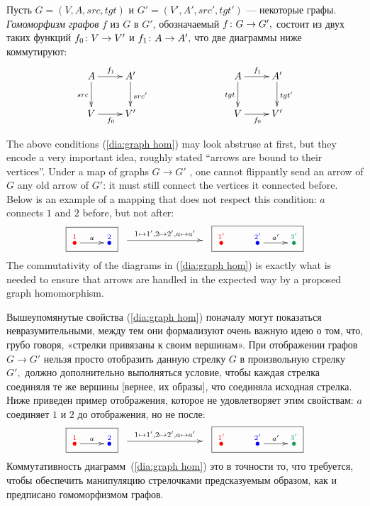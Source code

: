 \documentclass[../main/CT4S-EN-RU]{subfiles}
\begin{document}
\begin{definitionRUS}\label{def:graph homomorphism}
Пусть $G=(V,A,src,tgt)$ и $G'=(V',A',src',tgt')$ — некоторые графы. {\em Гомоморфизм графов} $f$ из $G$ в $G'$, обозначаемый $f\colon G\rightarrow G',$ состоит из двух таких функций $f_0\colon V\rightarrow V'$ и $f_1\colon A\rightarrow A',$ что две диаграммы ниже коммутируют:
\begin{align}\label{dia:graph hom}
\xymatrix{
    A \ar[r]^{f_1} \ar[d]_{src}  &  A' \ar[d]^{src'}  \\
    V \ar[r]_{f_0}  &  V'
}
\hspace{1in}
\xymatrix{
    A \ar[r]^{f_1} \ar[d]_{tgt}  &  A' \ar[d]^{tgt'}  \\
    V \ar[r]_{f_0}  &  V'
}
\end{align}
\end{definitionRUS}

\begin{remarkENG}
The above conditions (\ref{dia:graph hom}) may look abstruse at first, but they encode a very important idea, roughly stated “arrows are bound to their vertices”. Under a map of graphs $G\to G'$ , one cannot flippantly send an arrow of $G$ any old arrow of $G'$: it must still connect the vertices it connected before. Below is an example of a mapping that does not respect this condition: $a$ connects $1$ and $2$ before, but not after:
$$
\fbox{\xymatrix{\LMO{\color{red}{1}}\ar[r]^{a}&\LMO{\color{blue}{2}}}}
\xymatrix{~\ar[rr]^{1\mapsto 1',2\mapsto 2', a\mapsto a'}&\hsp&~}
\fbox{\xymatrix{\LMO{\color{red}{1'}}&\LMO{\color{blue}{2'}}\ar[r]^{a'}&\LMO{\color{ForestGreen}{3'}}}}
$$
The commutativity of the diagrams in (\ref{dia:graph hom}) is exactly what is needed to ensure that arrows are handled in the expected way by a proposed graph homomorphism.
\end{remarkENG}

\begin{remarkRUS}
Вышеупомянутые свойства (\ref{dia:graph hom}) поначалу могут показаться невразумительными, между тем они формализуют очень важную идею о том, что, грубо говоря, «стрелки привязаны к своим вершинам». При отображении графов $G\to G'$ нельзя просто отобразить данную стрелку $G$ в произвольную стрелку $G',$ должно дополнительно выполняться условие, чтобы каждая стрелка соединяля те же вершины [вернее, их образы], что соединяла исходная стрелка. Ниже приведен пример отображения, которое не удовлетворяет этим свойствам: $a$ соединяет $1$ и $2$ до отображения, но не после:
$$
\fbox{\xymatrix{
    \LMO{\color{red}{1}} \ar[r]^{a}  &  \LMO{\color{blue}{2}}
}}
\xymatrix{
    ~ \ar[rr]^{1\mapsto 1', 2\mapsto 2', a\mapsto a'}  &  \hsp  &  ~
}
\fbox{\xymatrix{
    \LMO{\color{red}{1'}}  &  \LMO{\color{blue}{2'}} \ar[r]^{a'}  &  \LMO{\color{ForestGreen}{3'}}
}}
$$
Коммутативность диаграмм~(\ref{dia:graph hom}) это в точности то, что требуется, чтобы обеспечить манипуляцию стрелочками предсказуемым образом, как и предписано гомоморфизмом графов.
\end{remarkRUS}
\end{document}
